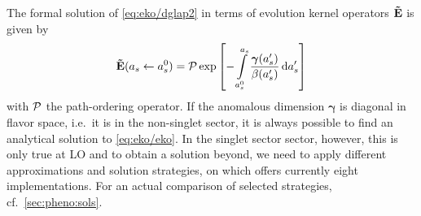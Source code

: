 The formal solution of \cref{eq:eko/dglap2} in terms of evolution kernel
operators $\vb {\tilde E}$ is given by
\begin{equation}
    \vb {\tilde E}(a_s \leftarrow a_s^0)  = \mathcal{P} \exp\qty[-\int\limits_{a_s^0}^{a_s} \frac{\bm{\gamma}(a_s')}{\beta(a_s')} \dd{a_s'} ]
    \label{eq:eko/eko}
\end{equation}
with $\mathcal{P}$ the path-ordering operator. If the anomalous dimension $\bm{\gamma}$ is
diagonal in flavor space, i.e.\ it is in the non-singlet sector, it is always
possible to find an analytical solution to \cref{eq:eko/eko}. 
In the singlet sector sector, however, this is only true at LO and to obtain a
solution beyond, we need to apply different approximations and solution
strategies, on which \eko{} offers currently eight implementations. For an
actual comparison of selected strategies, cf.\ \cref{sec:pheno:sols}.
